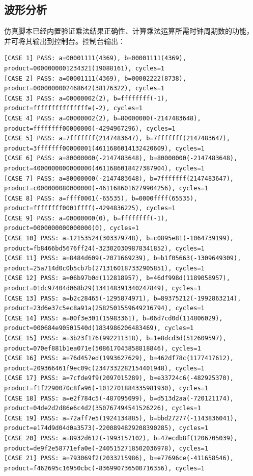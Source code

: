 \documentclass{article}
\begin{document}
\subsection{波形分析}
仿真脚本已经内置验证乘法结果正确性、计算乘法运算所需时钟周期数的功能，
并可将其输出到控制台。控制台输出：
\begin{verbatim}
[CASE 1] PASS: a=00001111(4369), b=00001111(4369), product=0000000001234321(19088161), cycles=1
[CASE 2] PASS: a=00001111(4369), b=00002222(8738), product=0000000002468642(38176322), cycles=1
[CASE 3] PASS: a=00000002(2), b=ffffffff(-1), product=fffffffffffffffe(-2), cycles=1
[CASE 4] PASS: a=00000002(2), b=80000000(-2147483648), product=ffffffff00000000(-4294967296), cycles=1
[CASE 5] PASS: a=7fffffff(2147483647), b=7fffffff(2147483647), product=3fffffff00000001(4611686014132420609), cycles=1
[CASE 6] PASS: a=80000000(-2147483648), b=80000000(-2147483648), product=4000000000000000(4611686018427387904), cycles=1
[CASE 7] PASS: a=80000000(-2147483648), b=7fffffff(2147483647), product=c000000080000000(-4611686016279904256), cycles=1
[CASE 8] PASS: a=ffff0001(-65535), b=0000ffff(65535), product=ffffffff0001ffff(-4294836225), cycles=1
[CASE 9] PASS: a=00000000(0), b=ffffffff(-1), product=0000000000000000(0), cycles=1
[CASE 10] PASS: a=12153524(303379748), b=c0895e81(-1064739199), product=fb8466bd5676ff24(-323020309878341852), cycles=1
[CASE 11] PASS: a=8484d609(-2071669239), b=b1f05663(-1309649309), product=25a714d0c0b5cb7b(2713160187332905851), cycles=1
[CASE 12] PASS: a=06b97b0d(112818957), b=46df998d(1189058957), product=01dc97404d068b29(134148391340247849), cycles=1
[CASE 13] PASS: a=b2c28465(-1295874971), b=89375212(-1992863214), product=23d6e37c5ec8a91a(2582501559649216794), cycles=1
[CASE 14] PASS: a=00f3e301(15983361), b=06d7cd0d(114806029), product=000684e90501540d(1834986206483469), cycles=1
[CASE 15] PASS: a=3b23f176(992211318), b=1e8dcd3d(512609597), product=070ef881b1ea071e(508617043858818846), cycles=1
[CASE 16] PASS: a=76d457ed(1993627629), b=462df78c(1177417612), product=209366461f9ec09c(2347332282154401948), cycles=1
[CASE 17] PASS: a=7cfde9f9(2097015289), b=e33724c6(-482925370), product=f1f2290070c8fa96(-1012701884335981930), cycles=1
[CASE 18] PASS: a=e2f784c5(-487095099), b=d513d2aa(-720121174), product=04de2d2d86e6c4d2(350767494541526226), cycles=1
[CASE 19] PASS: a=72aff7e5(1924134885), b=bbd27277(-1143836041), product=e174d9d04d0a3573(-2200894829208390285), cycles=1
[CASE 20] PASS: a=8932d612(-1993157102), b=47ecdb8f(1206705039), product=de9f2e58771efa0e(-2405152718502036978), cycles=1
[CASE 21] PASS: a=793069f2(2033215986), b=e77696ce(-411658546), product=f462695c16950cbc(-836990736500716356), cycles=1

\end{verbatim}
\end{document}

